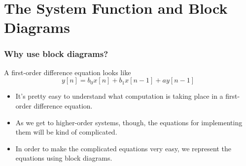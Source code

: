 \documentclass{beamer}
\begin{document}
\section[Block Diagrams]{The System Function and Block Diagrams}
\setcounter{subsection}{1}

\begin{frame}
  \frametitle{Why use block diagrams?}

  A first-order difference equation looks like
  \[
  y[n] = b_0x[n]+b_1x[n-1] +ay[n-1]
  \]
  \begin{itemize}
  \item It's pretty easy to understand what computation is taking
    place in a first-order difference equation.
  \item As we get to higher-order systems, though, the equations for
    implementing them will be kind of complicated.
  \item In order to make the complicated equations very easy, we
    represent the equations using block diagrams.
  \end{itemize}
\end{frame}
\end{document}
